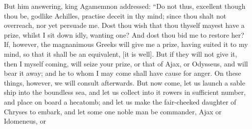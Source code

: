 \documentclass{ransom}
\begin{document}
But him answering, king Agamemnon addressed: “Do not thus, excellent
though thou be, godlike Achilles, practise deceit in thy mind; since
thou shalt not overreach, nor yet persuade me. Dost thou wish that thou
thyself mayest have a prize, whilst I sit down idly, wanting one?
And dost thou bid me to restore her? If, however, the magnanimous
Greeks will give me a prize, having suited it to my mind, so that it
shall be an equivalent, [it is well]. But if they will not give it,
then I myself coming, will seize your prize, or that of Ajax, or
Odysseus, and will bear it away; and he to whom I may come shall have
cause for anger. On these things, however, we will consult afterwards.
But now come, let us launch a sable ship into the boundless sea, and
let us collect into it rowers in sufficient number, and place on board
a hecatomb; and let us make the fair-cheeked daughter of Chryses to
embark, and let some one noble man be commander, Ajax or Idomeneus, or
\end{document}
